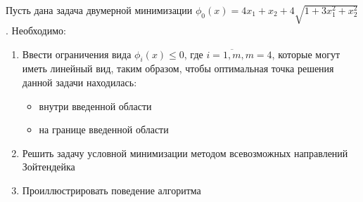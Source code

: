\documentclass[../body.tex]{subfiles}
\begin{document}
Пусть дана задача двумерной минимизации $\phi_0(x)=4x_1+x_2+4\sqrt{1+3x_1^2+x_2^2}$. Необходимо:
\begin{enumerate}
    \item Ввести ограничения вида $\phi_i(x)\leq0$, где $i=\overline{1,m},m=4$, которые могут иметь линейный вид, таким образом, чтобы оптимальная точка решения данной задачи находилась:
        \begin{itemize}
            \item внутри введенной области
            \item на границе введенной области
        \end{itemize}
    \item Решить задачу условной минимизации методом всевозможных направлений Зойтендейка
    \item Проиллюстрировать поведение алгоритма
\end{enumerate}
\end{document}
